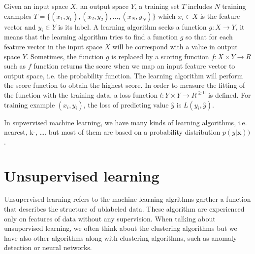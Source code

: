 Given an input space $X$, an output space $Y$, a training set $T$ includes $N$ training examples $T = \{(x_1,y_1), (x_2, y_2), ..., (x_N, y_N)\}$ which $x_i \in X$ is the feature vector and $y_i \in Y$ is its label. A learning algorithm seeks a function $g: X \rightarrow Y$, it means that the learning algorithm tries to find a function $g$ so that for each feature vector in the input space $X$ will be correspond with a value in output space $Y$. Sometimes, the function $g$ is replaced by a scoring function $f: X \times Y \rightarrow R$ such as $f$ function returns the score when we map an input feature vector to output space, i.e. the probability function. The learning algorithm will perform the score function to obtain the highest score. In order to measure the fitting of the function with the training data, a loss function $l: Y \times Y \rightarrow R^{\geq 0}$ is defined. For training example $(x_i,y_i)$, the loss of predicting value $\hat{y}$ is $L(y_i,\hat{y})$.

In supvervised machine learning, we have many kinds of learning algorithms, i.e. nearest, k-, \ldots. but most of them are based on a probability distribution $p(y|\textbf{x}))$. 
\section{Unsupervised learning}
Unsupervised learning refers to the machine learning algrithms garther a function that describes the structure of ublabeled data. These algorithm are experienced only on features of data without any supervision. When talking about unsupervised learning, we often think about the clustering algorithms but we have also other algorithms along with clustering algorithms, such as anomaly detection or neural networks. 

